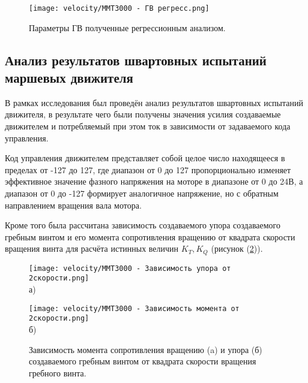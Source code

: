 \begin{figure}[ht]
    \centering
    \texttt{[image: velocity/MMT3000 - ГВ регресс.png]}
    \caption{Параметры ГВ полученные регрессионным анализом.}
    \label{fig:mmt3000_propeller}
\end{figure}

\subsection{Анализ результатов швартовных испытаний маршевых движителя}
В рамках исследования был проведён анализ результатов швартовных испытаний движителя, в результате чего были получены значения усилия создаваемые движителем и потребляемый при этом ток в зависимости от задаваемого кода управления.

Код управления движителем представляет собой целое число находящееся в пределах от -127 до 127, где диапазон от 0 до 127 пропорционально изменяет эффективное значение фазного напряжения на моторе в диапазоне от 0 до 24В, а диапазон от 0 до -127 формирует аналогичное напряжение, но с обратным направлением вращения вала мотора.


Кроме того была рассчитана зависимость создаваемого упора создаваемого гребным винтом и его момента сопротивления вращению от квадрата скорости вращения винта для расчёта истинных величин $K_T,K_Q$ (рисунок (\ref{fig:mmt3000_torque_rotation2})).

\begin{figure}[ht]
    \begin{minipage}[b][][b]{0.49\linewidth}\centering
        \texttt{[image: velocity/MMT3000 - Зависимость упора от 2скорости.png]}\\ а)
    \end{minipage}
    \hfill
    \begin{minipage}[b][][b]{0.49\linewidth}\centering
        \texttt{[image: velocity/MMT3000 - Зависимость момента от 2скорости.png]} \\ б) 
    \end{minipage}
    \caption{Зависимость момента сопротивления вращению (a) и упора (б) создаваемого гребным винтом от квадрата скорости вращения гребного винта.}
    \label{fig:mmt3000_torque_rotation2}
\end{figure}

